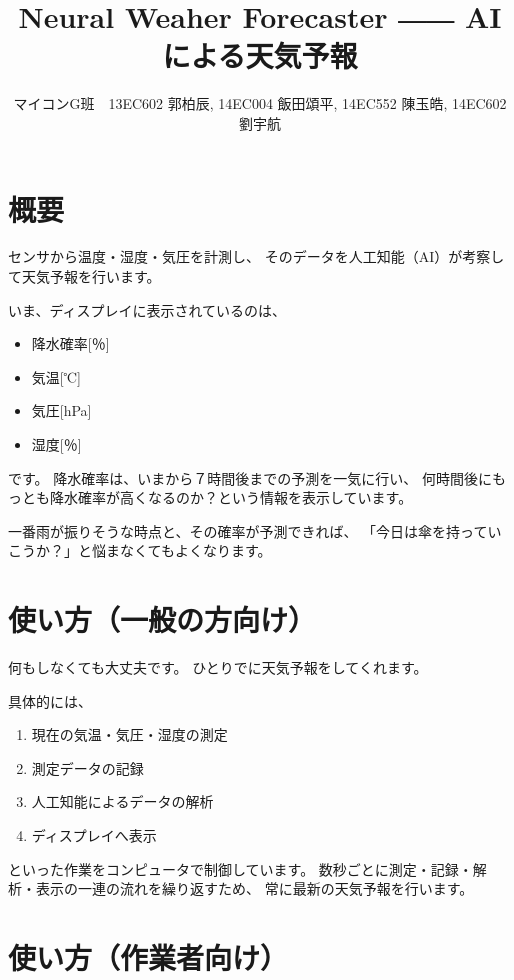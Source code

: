 \documentclass{jsarticle}
\title{Neural Weaher Forecaster ―― AIによる天気予報}
\author{マイコンG班　13EC602 郭柏辰, 14EC004 飯田頌平, 14EC552 陳玉皓, 14EC602 劉宇航}
\begin{document}
  \maketitle
  
  \begin{multicols}{2}
  
    \section{概要}

      センサから温度・湿度・気圧を計測し、
      そのデータを人工知能（AI）が考察して天気予報を行います。

      いま、ディスプレイに表示されているのは、
      \begin{itemize}
        \item 降水確率[％]
        \item 気温[℃]
        \item 気圧[hPa]
        \item 湿度[％]
      \end{itemize}
      です。
      降水確率は、いまから７時間後までの予測を一気に行い、
      何時間後にもっとも降水確率が高くなるのか？という情報を表示しています。

      一番雨が振りそうな時点と、その確率が予測できれば、
      「今日は傘を持っていこうか？」と悩まなくてもよくなります。

    \section{使い方（一般の方向け）}

      何もしなくても大丈夫です。
      ひとりでに天気予報をしてくれます。

      具体的には、
      \begin{enumerate}
        \item 現在の気温・気圧・湿度の測定
        \item 測定データの記録
        \item 人工知能によるデータの解析
        \item ディスプレイへ表示
      \end{enumerate}
      といった作業をコンピュータで制御しています。
      数秒ごとに測定・記録・解析・表示の一連の流れを繰り返すため、
      常に最新の天気予報を行います。

    \section{使い方（作業者向け）}


\end{multicols}
\end{document}
